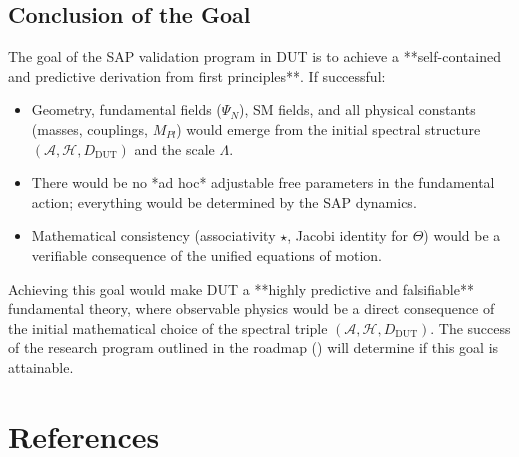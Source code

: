 \documentclass[11pt, a4paper]{article}
\theoremstyle{remark}
\begin{document}
\subsection{Conclusion of the Goal}
The goal of the SAP validation program in DUT is to achieve a **self-contained and predictive derivation from first principles**. If successful:
\begin{itemize}
    \item Geometry, fundamental fields (\(\Psi_N\)), SM fields, and all physical constants (masses, couplings, \(M_{Pl}\)) would emerge from the initial spectral structure \( (\mathcal{A}, \mathcal{H}, D_{\text{DUT}}) \) and the scale \( \Lambda \).
    \item There would be no *ad hoc* adjustable free parameters in the fundamental action; everything would be determined by the SAP dynamics.
    \item Mathematical consistency (associativity \( \star \), Jacobi identity for \( \Theta \)) would be a verifiable consequence of the unified equations of motion.
\end{itemize}
Achieving this goal would make DUT a **highly predictive and falsifiable** fundamental theory, where observable physics would be a direct consequence of the initial mathematical choice of the spectral triple \( (\mathcal{A}, \mathcal{H}, D_{\text{DUT}}) \). The success of the research program outlined in the roadmap () will determine if this goal is attainable.

\section{References}
\label{sec:references_final}



\end{document}
